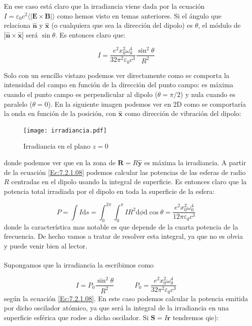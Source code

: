 \documentclass[12pt,a4paper]{article}
\newcommand{\D}{\mathrm{d}}
\newcommand{\tquad}{\quad \quad \quad}
\newcommand{\Bn}{\mathbf{B}}
\newcommand{\En}{\mathbf{E}}
\newcommand{\rn}{\mathbf{r}}
\newcommand{\Sn}{\mathbf{S}}
\newcommand{\Rn}{\mathbf{R}}
\newcommand{\hnn}{\hat{\mathbf{n}}}
\newcommand{\hnx}{\hat{\mathbf{x}}}
\newcommand{\hny}{\hat{\mathbf{y}}}
\numberwithin{equation}{section}
\numberwithin{figure}{section}
\begin{document}
En ese caso está claro que la irradiancia viene dada por la ecuación $I = \varepsilon_0 c^2 \langle | \En \times \Bn | \rangle$ como hemos visto en  temas anteriores. Si el ángulo que relaciona $\hnn$ y $\hnx$ (o cualquiera que sea la dirección del dipolo) es $\theta$, el módulo de $|\hnn \times \hnx|$ será $\sin \theta$. Es entonces claro que:

\begin{equation}
I = \dfrac{e^2 x_0^2 \omega_0^4}{32 \pi^2 \varepsilon_0 c^3} \dfrac{\sin^2 \theta}{R^2} \label{Ec:7.2.1.08}
\end{equation}

Solo con un sencillo vistazo podemos ver directamente como se comporta la intensidad del campo en función de la dirección del punto campo: es máxima cuando el punto campo es  perpendicular al dipolo ($\theta = \pi /2$) y nula cuando es paralelo ($\theta = 0$). En la siguiente imagen podemos ver en 2D como se comportaría la onda en función de la posición, con $\hnx$ como dirección de vibración del dipolo:

\begin{figure}[h!] \centering
\texttt{[image: irradiancia.pdf]}
\caption{Irradiancia en el plano $z=0$}
\end{figure}
donde podemos ver que en la zona de $\Rn = R  \hny$ es máxima la irradiancia. A partir de la ecuación \ref{Ec:7.2.1.08} podemos calcular las potencias de las esferas de radio $R$ centradas en el dipolo usando la integral de superficie. Es entonces claro que la potencia total irradiada por el dipolo en toda la superficie de la esfera:

\begin{equation}
P = \int I \D s = \int_0^{2\pi} \int_{0}^\pi I R^2 \D \phi \D \cos \theta = \dfrac{e^2 x_0^2 \omega_0^4}{12 \pi \varepsilon_0 c^3} \label{Ec:7.2.1.09}
\end{equation}
donde la característica mas notable es que depende de la cuarta potencia de la frecuencia. De hecho vamos a tratar de resolver esta integral, ya que no es obvia y puede venir bien al lector. \\ 

\hrulefill \\
Supongamos que la irradiancia la escribimos como 

$$ I = P_0 \dfrac{\sin^2 \theta}{R^2} \tquad P_0 = \dfrac{e^2 x_0^2 \omega_0^4}{32 \pi^2 \varepsilon_0 c^3} $$
según la ecuación \ref{Ec:7.2.1.08}. En este caso podemos calcular la potencia emitida por dicho oscilador atómico, ya que será la integral de la irradiancia en una superficie esférica que rodee a dicho oscilador. Si $\Sn = I \rn$ tendremos qie):
\end{document}
